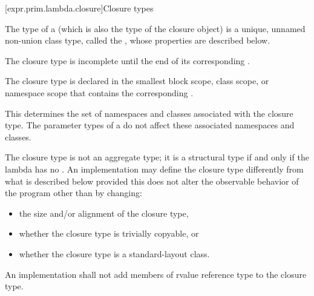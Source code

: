 [expr.prim.lambda.closure]{Closure types}%

\pnum
The type of a  (which is also the type of the
closure object) is a unique, unnamed non-union class type,
called the ,
whose properties are described below.

\pnum
The closure type is incomplete
until the end of its corresponding .

\pnum
The closure type is declared in the smallest block
scope, class scope, or namespace scope that contains the corresponding
.
\begin{note}
This determines the set of namespaces and
classes associated with the closure type. The parameter
types of a  do not affect these associated namespaces and
classes.
\end{note}

\pnum
The closure type is not an aggregate type;
it is a structural type if and only if
the lambda has no .
An implementation may define the closure type differently from what
is described below provided this does not alter the observable behavior of the program
other than by changing:
\begin{itemize}
\item the size and/or alignment of the closure type,
\item whether the closure type is trivially copyable, or
\item whether the closure type is a standard-layout class.
\end{itemize}

An implementation shall not add members of rvalue reference type to the closure
type.

